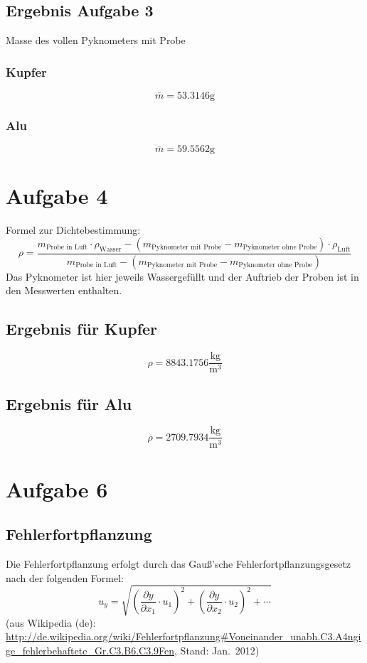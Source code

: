 \documentclass[12pt,a4paper,notitlepage]{article}
\begin{document}
\subsection{Ergebnis Aufgabe 3}
Masse des vollen Pyknometers mit Probe
\subsubsection{Kupfer}
\begin{equation}
\overline m=53.3146\mathrm{g}
\end{equation}
\subsubsection{Alu}
\begin{equation}
\overline m=59.5562\mathrm{g}
\end{equation}

\section{Aufgabe 4}
Formel zur Dichtebestimmung:
\begin{equation}
\label{dichteformel}
\rho = \frac{m_\text{Probe in Luft}\cdot\rho_\text{Wasser}-\left(m_\text{Pyknometer mit Probe}-m_\text{Pyknometer ohne Probe}\right)\cdot\rho_\text{Luft}}{m_\text{Probe in Luft}-\left(m_\text{Pyknometer mit Probe}-m_\text{Pyknometer ohne Probe}\right)}
\end{equation}
Das Pyknometer ist hier jeweils Wassergefüllt und der Auftrieb der Proben ist in den Messwerten enthalten.
\subsection{Ergebnis für Kupfer}
\begin{equation}
\rho=8843.1756\frac{\mathrm{kg}}{\mathrm{m}^3}
\end{equation}
\subsection{Ergebnis für Alu}
\begin{equation}
\rho=2709.7934\frac{\mathrm{kg}}{\mathrm{m}^3}
\end{equation}

\section{Aufgabe 6}
\subsection{Fehlerfortpflanzung}
Die Fehlerfortpflanzung erfolgt durch das Gauß'sche Fehlerfortpflanzungsgesetz nach der folgenden Formel:
\begin{equation}
\label{gaussianerrordings}
{u_y}=\sqrt {\left (\frac{\partial y}{\partial x_1} \cdot u_1 \right)^2 +\left (\frac{\partial y}{\partial x_2} \cdot u_2 \right)^2 +\cdots }
\end{equation}
(aus Wikipedia (de): \url{http://de.wikipedia.org/wiki/Fehlerfortpflanzung#Voneinander_unabh.C3.A4ngige_fehlerbehaftete_Gr.C3.B6.C3.9Fen}, Stand: Jan.\ 2012)
\end{document}
